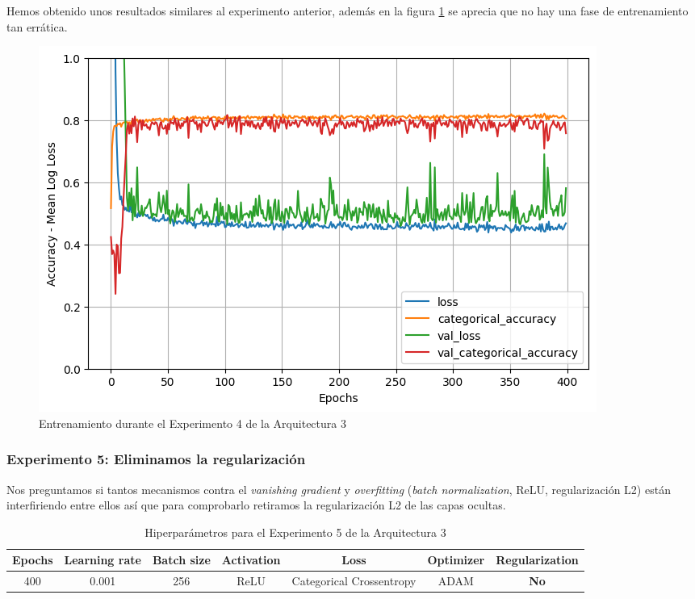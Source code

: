 \documentclass{article}
\begin{document}
			Hemos obtenido unos resultados similares al experimento anterior, adem\'as en la figura \ref{d-tr-a3-e4} se aprecia que no hay una fase de entrenamiento tan err\'atica.
			\begin{figure}[!h]
				\begin{center}
					\includegraphics[scale=0.5]{d-tr-a3-e4.png}		
					\caption{Entrenamiento durante el Experimento 4 de la Arquitectura 3}	
					\label{d-tr-a3-e4}
				\end{center}
			\end{figure}
			
		\subsubsection{Experimento 5: Eliminamos la regularizaci\'on}
		\label{d-s-a3-e5}
			Nos preguntamos si tantos mecanismos contra el \textit{vanishing gradient} y \textit{overfitting} (\textit{batch normalization}, ReLU, regularizaci\'on L2) est\'an interfiriendo entre ellos as\'i que para comprobarlo retiramos la regularizaci\'on L2 de las capas ocultas.
			\begin{table}[!h]
				\begin{tabular}{| c | c | c | c | c | c | c |}
					\textbf{Epochs} & \textbf{Learning rate} & \textbf{Batch size} & \textbf{Activation} & \textbf{Loss} & \textbf{Optimizer} & \textbf{Regularization} \\ \hline
					400 & 0.001 & 256 & ReLU & Categorical Crossentropy & ADAM & \textbf{No}
				\end{tabular}
				\caption{Hiperpar\'ametros para el Experimento 5 de la Arquitectura 3}
				\label{tab:hip-d-a3-e5}
			\end{table}
			
\end{document}
